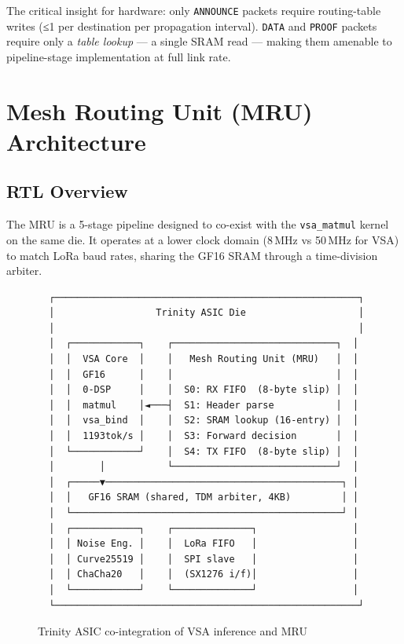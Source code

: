 The critical insight for hardware: only \texttt{ANNOUNCE} packets
require routing-table writes (≤1 per destination per propagation
interval).  \texttt{DATA} and \texttt{PROOF} packets require only a
\emph{table lookup} — a single SRAM read — making them amenable to
pipeline-stage implementation at full link rate.

\section{Mesh Routing Unit (MRU) Architecture}

\subsection{RTL Overview}

The MRU is a 5-stage pipeline designed to co-exist with the
\texttt{vsa\_matmul} kernel on the same die.
It operates at a lower clock domain (8\,MHz vs 50\,MHz for VSA)
to match LoRa baud rates, sharing the GF16 SRAM through a
time-division arbiter.

\begin{figure}[h]
\centering
\begin{verbatim}
  ┌──────────────────────────────────────────────────────┐
  │                  Trinity ASIC Die                    │
  │                                                      │
  │  ┌────────────┐    ┌─────────────────────────────┐  │
  │  │  VSA Core  │    │   Mesh Routing Unit (MRU)   │  │
  │  │  GF16      │    │                             │  │
  │  │  0-DSP     │    │  S0: RX FIFO  (8-byte slip) │  │
  │  │  matmul    │◄───┤  S1: Header parse           │  │
  │  │  vsa_bind  │    │  S2: SRAM lookup (16-entry) │  │
  │  │  1193tok/s │    │  S3: Forward decision       │  │
  │  └────────────┘    │  S4: TX FIFO  (8-byte slip) │  │
  │        │           └─────────────────────────────┘  │
  │  ┌─────▼──────────────────────────────────────────┐ │
  │  │   GF16 SRAM (shared, TDM arbiter, 4KB)         │ │
  │  └────────────────────────────────────────────────┘ │
  │  ┌────────────┐    ┌──────────────┐                 │
  │  │ Noise Eng. │    │  LoRa FIFO   │                 │
  │  │ Curve25519 │    │  SPI slave   │                 │
  │  │ ChaCha20   │    │  (SX1276 i/f)│                 │
  │  └────────────┘    └──────────────┘                 │
  └──────────────────────────────────────────────────────┘
\end{verbatim}
\caption{Trinity ASIC co-integration of VSA inference and MRU}
\label{ch_35_mesh_node:fig:asic-block}
\end{figure}


